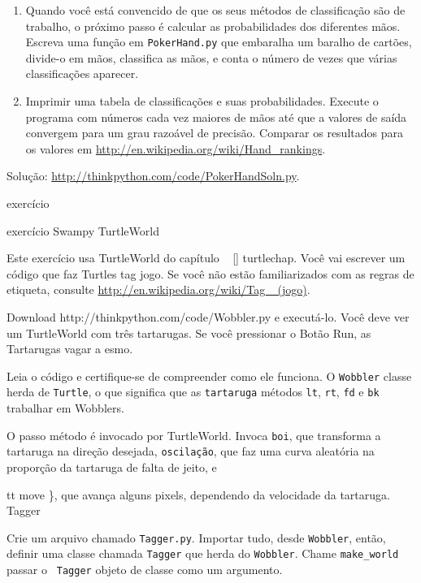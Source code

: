 \documentclass[10pt]{book}
\begin{document}
\begin{v erbatim}
\begin{}
\begin{enumerate}
\item Quando você está convencido de que os seus métodos de classificação são
de trabalho, o próximo passo é calcular as probabilidades dos diferentes
mãos. Escreva uma função em {\tt PokerHand.py} que embaralha um baralho de
cartões, divide-o em mãos, classifica as mãos, e conta o
número de vezes que várias classificações aparecer.

\item Imprimir uma tabela de classificações e suas probabilidades.
Execute o programa com números cada vez maiores de mãos até que a
valores de saída convergem para um grau razoável de precisão. Comparar
os resultados para os valores em \url{http://en.wikipedia.org/wiki/Hand_rankings}.

\end{enumerate}

Solução: \url{http://thinkpython.com/code/PokerHandSoln.py}.
\end{} exercício


\begin{} exercício
\index{} Swampy
\index{} TurtleWorld

Este exercício usa TurtleWorld do capítulo ~ \ref {} turtlechap.
Você vai escrever um código que faz Turtles tag jogo. Se você
não estão familiarizados com as regras de etiqueta, consulte
\url{http://en.wikipedia.org/wiki/Tag_ (jogo)}.

\begin{enumerate}

\item Download \url{} http://thinkpython.com/code/Wobbler.py e executá-lo. Você
deve ver um TurtleWorld com três tartarugas. Se você pressionar o
Botão {\sf Run}, as Tartarugas vagar a esmo.

\item Leia o código e certifique-se de compreender como ele funciona.
O {\tt Wobbler} classe herda de {\tt Turtle}, o que significa
que as {\tt tartaruga} métodos {\tt lt}, {\tt rt}, {\tt fd}
e {\tt bk} trabalhar em Wobblers.

O passo {\tt} método é invocado por TurtleWorld. Invoca
{\tt boi}, que transforma a tartaruga na direção desejada,
{\tt oscilação}, que faz uma curva aleatória na proporção da tartaruga de
falta de jeito, e {tt move \}, que avança alguns pixels,
dependendo da velocidade da tartaruga.
\index{} Tagger

\item Crie um arquivo chamado {\tt Tagger.py}. Importar tudo, desde
  {\tt Wobbler}, então, definir uma classe chamada {\tt Tagger} que herda
  do {\tt Wobbler}. Chame \verb "make_world" passar o {\tt
    Tagger} objeto de classe como um argumento.

}
\end{enumerate}
\end{}
\end{v erbatim}
\end{document}
